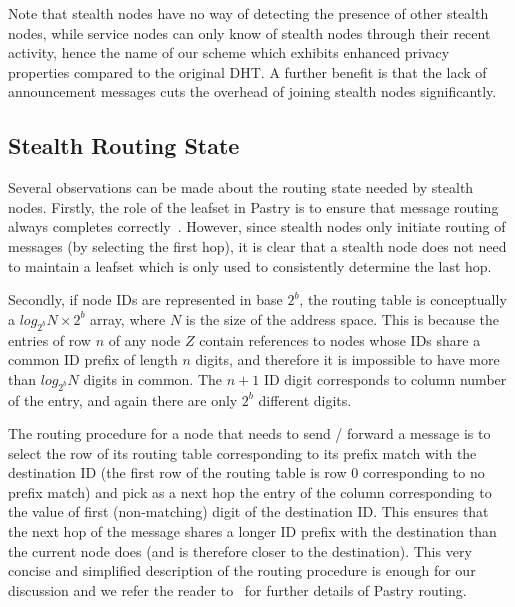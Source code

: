 \documentclass[letterpaper]{sig-alternate} %
\begin{document}
Note that stealth nodes have no way of detecting the presence of
other stealth nodes, while service nodes can only know of stealth
nodes through their recent activity, hence the name of our scheme
which exhibits enhanced privacy properties compared to the original
DHT. A further benefit is that the lack of announcement messages
cuts the overhead of joining stealth nodes significantly.

\subsection{Stealth Routing State}
\label{subsect-state}

Several observations can be made about the routing state needed by
stealth nodes. Firstly, the role of the leafset in Pastry is to
ensure that message routing always completes
correctly~\cite{rowstron01pastry}. However, since stealth nodes only
initiate routing of messages (by selecting the first hop), it is
clear that a stealth node does not need to maintain a leafset which
is only used to consistently determine the last hop.

Secondly, if node IDs are represented in base $2^b$, the routing table is
conceptually a $log_{2^b}N \times 2^b$ array, where $N$ is the size of the
address space. This is because the entries of row $n$ of any node $Z$ contain
references to nodes whose IDs share a common ID prefix of length $n$ digits,
and therefore it is impossible to have more than $log_{2^b}N$ digits in common.
The $n+1$ ID digit corresponds to column number of the entry, and again there
are only $2^b$ different digits.

The routing procedure for a node that needs to send / forward a message is to
select the row of its routing table corresponding to its prefix match with the
destination ID (the first row of the routing table is row $0$ corresponding to
no prefix match) and pick as a next hop the entry of the column corresponding
to the value of first (non-matching) digit of the destination ID. This ensures
that the next hop of the message shares a longer ID prefix with the destination
than the current node does (and is therefore closer to the destination). This
very concise and simplified description of the routing procedure is enough for
our discussion and we refer the reader to~\cite{rowstron01pastry} for further
details of Pastry routing.
\end{document}

